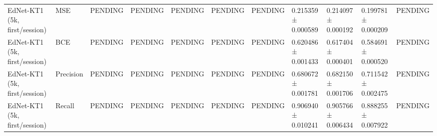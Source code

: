 \begin{longtable}{lllllllllll}
EdNet-KT1 (5k, first/session) & MSE & PENDING & PENDING & PENDING & PENDING & PENDING & 0.215359 ± 0.000589 & 0.214097 ± 0.000192 & 0.199781 ± 0.000209 & PENDING \\
EdNet-KT1 (5k, first/session) & BCE & PENDING & PENDING & PENDING & PENDING & PENDING & 0.620486 ± 0.001433 & 0.617404 ± 0.000401 & 0.584691 ± 0.000520 & PENDING \\
EdNet-KT1 (5k, first/session) & Precision & PENDING & PENDING & PENDING & PENDING & PENDING & 0.680672 ± 0.001781 & 0.682150 ± 0.001706 & 0.711542 ± 0.002475 & PENDING \\
EdNet-KT1 (5k, first/session) & Recall & PENDING & PENDING & PENDING & PENDING & PENDING & 0.906940 ± 0.010241 & 0.905766 ± 0.006434 & 0.888255 ± 0.007922 & PENDING \\
\end{longtable}
